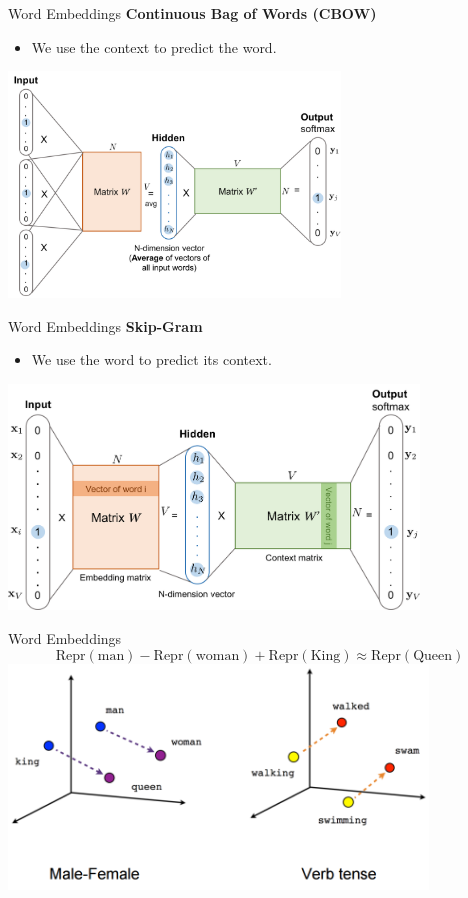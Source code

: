 \documentclass[aspectratio=169]{beamer}
\begin{document}
\begin{frame}{Word Embeddings}
\vspace{.2cm}
\textbf{Continuous Bag of Words (CBOW)}
\begin{itemize}
	\item We use the context to predict the word.
\end{itemize}
\centering
\includegraphics[height=6cm]{figures/word2vec-cbow.png}
\end{frame}

\begin{frame}{Word Embeddings}
\vspace{.2cm}
\textbf{Skip-Gram}
\begin{itemize}
	\item We use the word to predict its context.
\end{itemize}
\centering
\includegraphics[height=6cm]{figures/word2vec-skip-gram.png}
\end{frame}

\begin{frame}{Word Embeddings}
$$ \mathrm{Repr(man)} - \mathrm{Repr(woman)} + \mathrm{Repr(King)} \approx \mathrm{Repr(Queen)} $$
\centering
\includegraphics[height=6cm]{figures/male_female_verb_tense.png}

\end{frame}
\end{document}
